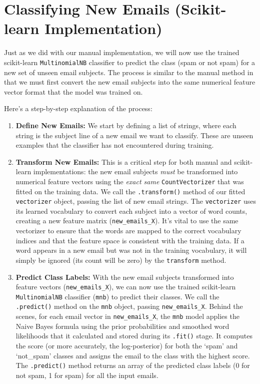 \documentclass[12pt,letterpaper]{article}
\begin{document}
\section{Classifying New Emails (Scikit-learn Implementation)}

Just as we did with our manual implementation, we will now use the trained scikit-learn \texttt{MultinomialNB} classifier to predict the class (spam or not spam) for a new set of unseen email subjects. The process is similar to the manual method in that we must first convert the new email subjects into the same numerical feature vector format that the model was trained on.

Here's a step-by-step explanation of the process:

\begin{enumerate}
    \item \textbf{Define New Emails:} We start by defining a list of strings, where each string is the subject line of a new email we want to classify. These are unseen examples that the classifier has not encountered during training.
    
    \item \textbf{Transform New Emails:} This is a critical step for both manual and scikit-learn implementations: the new email subjects \textit{must} be transformed into numerical feature vectors using the \textit{exact same} \texttt{CountVectorizer} that was fitted on the training data. We call the \texttt{.transform()} method of our fitted \texttt{vectorizer} object, passing the list of new email strings. The \texttt{vectorizer} uses its learned vocabulary to convert each subject into a vector of word counts, creating a new feature matrix (\texttt{new\_emails\_X}). It's vital to use the same vectorizer to ensure that the words are mapped to the correct vocabulary indices and that the feature space is consistent with the training data. If a word appears in a new email but was not in the training vocabulary, it will simply be ignored (its count will be zero) by the \texttt{transform} method.
    
    \item \textbf{Predict Class Labels:} With the new email subjects transformed into feature vectors (\texttt{new\_emails\_X}), we can now use the trained scikit-learn \texttt{MultinomialNB} classifier (\texttt{mnb}) to predict their classes. We call the \texttt{.predict()} method on the \texttt{mnb} object, passing \texttt{new\_emails\_X}. Behind the scenes, for each email vector in \texttt{new\_emails\_X}, the \texttt{mnb} model applies the Naive Bayes formula using the prior probabilities and smoothed word likelihoods that it calculated and stored during its \texttt{.fit()} stage. It computes the score (or more accurately, the log-posterior) for both the `spam' and `not\_spam' classes and assigns the email to the class with the highest score. The \texttt{.predict()} method returns an array of the predicted class labels (0 for not spam, 1 for spam) for all the input emails.
    

\end{enumerate}
\end{document}
